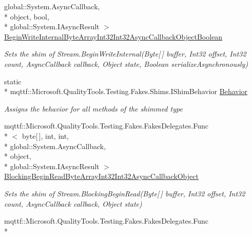 \begin{DoxyCompactItemize}
global\-::\-System.\-Async\-Callback, \\*
object, bool, \\*
global\-::\-System.\-I\-Async\-Result $>$ \hyperlink{class_system_1_1_i_o_1_1_fakes_1_1_shim_stream_adf18beed382235c8b437e3109261e7d0}{Begin\-Write\-Internal\-Byte\-Array\-Int32\-Int32\-Async\-Callback\-Object\-Boolean}
\begin{DoxyCompactList}\small\item\em Sets the shim of Stream.\-Begin\-Write\-Internal(\-Byte\mbox{[}$\,$\mbox{]} buffer, Int32 offset, Int32 count, Async\-Callback callback, Object state, Boolean serialize\-Asynchronously)\end{DoxyCompactList}\item 
static \\*
mqttf\-::\-Microsoft.\-Quality\-Tools.\-Testing.\-Fakes.\-Shims.\-I\-Shim\-Behavior \hyperlink{class_system_1_1_i_o_1_1_fakes_1_1_shim_stream_abaf9121708c28b2b75a3d246acc6071d}{Behavior}
\begin{DoxyCompactList}\small\item\em Assigns the behavior for all methods of the shimmed type\end{DoxyCompactList}\item 
mqttf\-::\-Microsoft.\-Quality\-Tools.\-Testing.\-Fakes.\-Fakes\-Delegates.\-Func\\*
$<$ byte\mbox{[}$\,$\mbox{]}, int, int, \\*
global\-::\-System.\-Async\-Callback, \\*
object, \\*
global\-::\-System.\-I\-Async\-Result $>$ \hyperlink{class_system_1_1_i_o_1_1_fakes_1_1_shim_stream_af306d6ec26adfa2af54ceb3322f64240}{Blocking\-Begin\-Read\-Byte\-Array\-Int32\-Int32\-Async\-Callback\-Object}
\begin{DoxyCompactList}\small\item\em Sets the shim of Stream.\-Blocking\-Begin\-Read(\-Byte\mbox{[}$\,$\mbox{]} buffer, Int32 offset, Int32 count, Async\-Callback callback, Object state)\end{DoxyCompactList}\item 
mqttf\-::\-Microsoft.\-Quality\-Tools.\-Testing.\-Fakes.\-Fakes\-Delegates.\-Func\\*

\end{DoxyCompactItemize}
